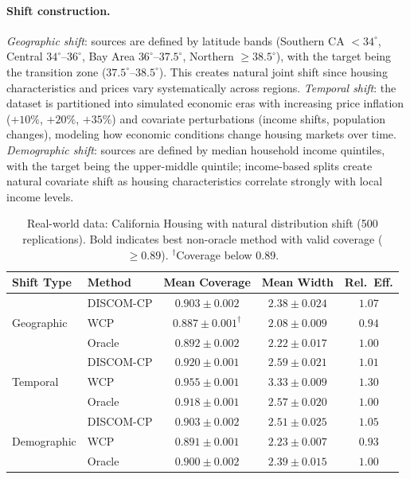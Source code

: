 \documentclass{article}
\newcommand{\DISCOM}{\textsc{DISCOM-CP}}
\begin{document}
\paragraph{Shift construction.} \emph{Geographic shift}: sources are defined by latitude bands (Southern CA $< 34^\circ$, Central $34^\circ$--$36^\circ$, Bay Area $36^\circ$--$37.5^\circ$, Northern $\geq 38.5^\circ$), with the target being the transition zone ($37.5^\circ$--$38.5^\circ$). This creates natural joint shift since housing characteristics and prices vary systematically across regions. \emph{Temporal shift}: the dataset is partitioned into simulated economic eras with increasing price inflation ($+10\%$, $+20\%$, $+35\%$) and covariate perturbations (income shifts, population changes), modeling how economic conditions change housing markets over time. \emph{Demographic shift}: sources are defined by median household income quintiles, with the target being the upper-middle quintile; income-based splits create natural covariate shift as housing characteristics correlate strongly with local income levels.

\begin{table}[t]
\caption{Real-world data: California Housing with natural distribution shift (500 replications). Bold indicates best non-oracle method with valid coverage ($\geq 0.89$). $^\dagger$Coverage below 0.89.}
\label{tab:real_world}
\centering
\small
\begin{tabular}{llccc}
\toprule
\textbf{Shift Type} & \textbf{Method} & \textbf{Mean Coverage} & \textbf{Mean Width} & \textbf{Rel.\ Eff.} \\
\midrule
\multirow{3}{*}{Geographic} & \DISCOM{} & $\mathbf{0.903 \pm 0.002}$ & $\mathbf{2.38 \pm 0.024}$ & $\mathbf{1.07}$ \\
& WCP & $0.887 \pm 0.001^\dagger$ & $2.08 \pm 0.009$ & $0.94$ \\
& Oracle & $0.892 \pm 0.002$ & $2.22 \pm 0.017$ & $1.00$ \\
\midrule
\multirow{3}{*}{Temporal} & \DISCOM{} & $\mathbf{0.920 \pm 0.001}$ & $\mathbf{2.59 \pm 0.021}$ & $\mathbf{1.01}$ \\
& WCP & $0.955 \pm 0.001$ & $3.33 \pm 0.009$ & $1.30$ \\
& Oracle & $0.918 \pm 0.001$ & $2.57 \pm 0.020$ & $1.00$ \\
\midrule
\multirow{3}{*}{Demographic} & \DISCOM{} & $\mathbf{0.903 \pm 0.002}$ & $\mathbf{2.51 \pm 0.025}$ & $\mathbf{1.05}$ \\
& WCP & $0.891 \pm 0.001$ & $2.23 \pm 0.007$ & $0.93$ \\
& Oracle & $0.900 \pm 0.002$ & $2.39 \pm 0.015$ & $1.00$ \\
\bottomrule
\end{tabular}
\end{table}
\end{document}
